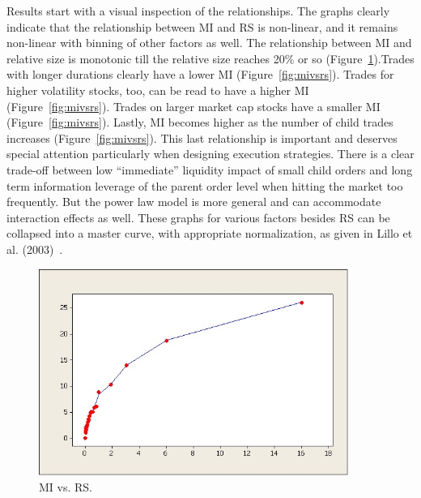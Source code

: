 Results start with a visual inspection of the relationships. The graphs clearly indicate that the relationship between MI and RS is non-linear, and it remains non-linear with binning of other factors as well. The relationship between MI and relative size is monotonic till the relative size reaches 20\% or so (Figure~\ref{fig:miandrsplot}).Trades with longer durations clearly have a lower MI (Figure~\ref{fig:mivsrs}). Trades for higher volatility stocks, too, can be read to have a higher MI (Figure~\ref{fig:mivsrs}). Trades on larger market cap stocks have a smaller MI (Figure~\ref{fig:mivsrs}). Lastly, MI becomes higher as the number of child trades increases (Figure~\ref{fig:mivsrs}). This last relationship is important and deserves special attention particularly when designing execution strategies. There is a clear trade-off between low ``immediate'' liquidity impact of small child orders and long term information leverage of the parent order level when hitting the market too frequently. But the power law model is more general and can accommodate interaction effects as well. These graphs for various factors besides RS can be collapsed into a master curve, with appropriate normalization, as given in Lillo et al. (2003)~\cite{farmermantegna}.
	
	\begin{figure}[!ht]
	\centering
	\includegraphics[width=0.9\textwidth]{chapters/chapter_exec_models/figures/fig3.jpg}
	\caption{MI vs. RS. \label{fig:miandrsplot}}
	\end{figure}

